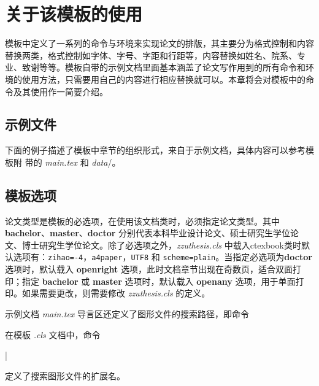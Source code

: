 \chapter{关于该模板的使用}
\label{cha:usage}

模板中定义了一系列的命令与环境来实现论文的排版，其主要分为格式控制和内容替换两类，格式控制如字体、字号、字距和行距等，内容替换如姓名、院系、专业、致谢等等。模板自带的示例文档里面基本涵盖了论文写作用到的所有命令和环境的使用方法，只需要用自己的内容进行相应替换就可以。本章将会对模板中的命令及其使用作一简要介绍。

\section{\zzuthesis{} 示例文件}

下面的例子描述了模板中章节的组织形式，来自于示例文档，具体内容可以参考模板附
带的 \emph{main.tex} 和 \emph{data}\//。



\section{模板选项}
\label{sec:option}


论文类型是模板的必选项，在使用该文档类时，必须指定论文类型。其中 \textbf{bachelor}、\textbf{master}、\textbf{doctor} 分别代表本科毕业设计论文、硕士研究生学位论文、博士研究生学位论文。除了必选项之外，\emph{zzuthesis.cls} 中载入ctexbook类时默认选项有：\texttt{zihao=-4}，\texttt{a4paper}，\texttt{UTF8} 和 \texttt{scheme=plain}。当指定必选项为\textbf{doctor} 选项时，默认载入 \textbf{openright} 选项，此时文档章节出现在奇数页，适合双面打印；指定 \textbf{bachelor} 或 \textbf{master} 选项时，默认载入 \textbf{openany} 选项，用于单面打印。如果需要更改，则需要修改 \emph{zzuthesis.cls} 的定义。

示例文档 \emph{main.tex} 导言区还定义了图形文件的搜索路径，即命令
\begin{latex}
\graphicspath{}
\end{latex}
在模板 \emph{.cls} 文档中，命令
\begin{latex}
|
\end{latex}
定义了搜索图形文件的扩展名。

